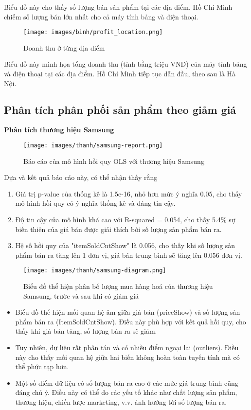 Biểu đồ này cho thấy số lượng bán sản phẩm tại các địa điểm. Hồ Chí Minh chiếm số lượng bán lớn nhất cho cả máy tính bảng và điện thoại.

\begin{figure}[H]
    \centering
    \texttt{[image: images/binh/profit\_location.png]}
    \caption{Doanh thu ở từng địa điểm}
    \label{fig:profit_location}
\end{figure}

Biểu đồ này minh họa tổng doanh thu (tính bằng triệu VNĐ) của máy tính bảng và điện thoại tại các địa điểm. Hồ Chí Minh tiếp tục dẫn đầu, theo sau là Hà Nội.

\subsection{Phân tích phân phối sản phẩm theo giảm giá}
\textbf{Phân tích thương hiệu Samsung}
\begin{figure}[H]
    \centering
    \texttt{[image: images/thanh/samsung-report.png]}
    \caption{Báo cáo của mô hình hồi quy OLS với thương hiệu Samsung}
    \label{fig:samsung-report}
\end{figure}

Dựa và kết quả báo cáo này, có thể nhận thấy rằng
\begin{enumerate}
  \item Giá trị p-value của thống kê là 1.5e-16, nhỏ hơn mức ý nghĩa 0.05, cho thấy mô hình hồi quy có ý nghĩa thống kê và đáng tin cậy.
  \item Độ tin cậy của mô hình khá cao với R-squared = 0.054, cho thấy 5.4\% sự biến thiên của giá bán được giải thích bởi số lượng sản phẩm bán ra.
  \item Hệ số hồi quy của "itemSoldCntShow" là 0.056, cho thấy khi số lượng sản phẩm bán ra tăng lên 1 đơn vị, giá bán trung bình sẽ tăng lên 0.056 đơn vị.
\end{enumerate}

\begin{figure}[H]
    \centering
    \texttt{[image: images/thanh/samsung-diagram.png]}
    \caption{Biểu đồ thể hiện phân bố lượng mua hàng hoá của thương hiệu Samsung, trước và sau khi có giảm giá}
    \label{fig:samsung-diagram}
\end{figure}

\begin{itemize}
    \item Biểu đồ thể hiện mối quan hệ âm giữa giá bán (priceShow) và số lượng sản phẩm bán ra (ItemSoldCntShow). Điều này phù hợp với kết quả hồi quy, cho thấy khi giá bán tăng, số lượng bán ra sẽ giảm.
    \item Tuy nhiên, dữ liệu rất phân tán và có nhiều điểm ngoại lai (outliers). Điều này cho thấy mối quan hệ giữa hai biến không hoàn toàn tuyến tính mà có thể phức tạp hơn.
    \item Một số điểm dữ liệu có số lượng bán ra cao ở các mức giá trung bình cũng đáng chú ý. Điều này có thể do các yếu tố khác như chất lượng sản phẩm, thương hiệu, chiến lược marketing, v.v. ảnh hưởng tới số lượng bán ra.
\end{itemize}
    
